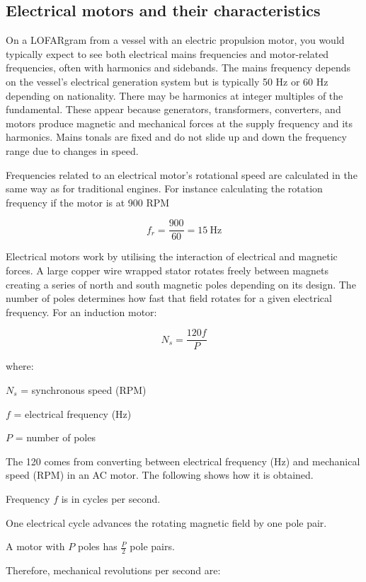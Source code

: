 \subsection{Electrical motors and their characteristics}

On a LOFARgram from a vessel with an electric propulsion motor, you would typically expect to see both electrical mains frequencies and motor-related frequencies, often with harmonics and sidebands. The mains frequency depends on the vessel's electrical generation system but is typically 50 Hz or 60 Hz depending on nationality. There may be harmonics at integer multiples of the fundamental. These appear because generators, transformers, converters, and motors produce magnetic and mechanical forces at the supply frequency and its harmonics. Mains tonals are fixed and do not slide up and down the frequency range due to changes in speed.

Frequencies related to an electrical motor's rotational speed are calculated in the same way as for traditional engines. For instance calculating the rotation frequency if the motor is at 900 RPM

\[
f_r = \frac{900}{60} = 15 \mathrm{ \ Hz}
\]

Electrical motors work by utilising the interaction of electrical and magnetic forces. A large copper wire wrapped stator rotates freely between magnets creating a series of north and south magnetic poles depending on its design. The number of poles determines how fast that field rotates for a given electrical frequency. For an induction motor:

\[
N_s = \frac{120f}{P}
\]

where:

\begin{compactitem}
    \item $N_s$ = synchronous speed (RPM)
    \item $f$ = electrical frequency (Hz)
    \item $P$ = number of poles
\end{compactitem}


The 120 comes from converting between electrical frequency (Hz) and mechanical speed (RPM) in an AC motor. The following shows how it is obtained.

\begin{compactenum}
    \item Frequency $f$ is in cycles per second.
    \item One electrical cycle advances the rotating magnetic field by one pole pair.
    \item A motor with $P$ poles has $\frac{P}{2}$ pole pairs.
    \item Therefore, mechanical revolutions per second are:
\end{compactenum}

